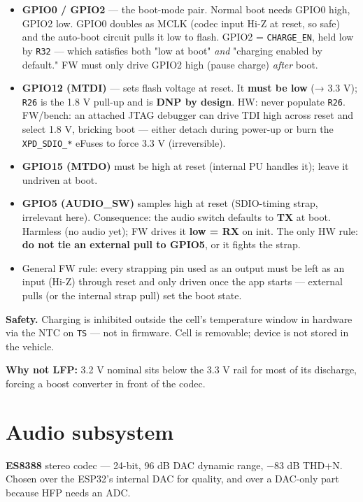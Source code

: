 \documentclass[11pt]{article}
\begin{document}
\begin{itemize}[leftmargin=1.4em]
\item \textbf{GPIO0 / GPIO2} — the boot-mode pair. Normal boot needs GPIO0 high, GPIO2 low. GPIO0
  doubles as MCLK (codec input Hi-Z at reset, so safe) and the auto-boot circuit pulls it low to
  flash. GPIO2 = \texttt{CHARGE_EN}, held low by \texttt{R32} — which satisfies both "low at boot"
  \textit{and} "charging enabled by default." FW must only drive GPIO2 high (pause charge)
  \textit{after} boot.
\item \textbf{GPIO12 (MTDI)} — sets flash voltage at reset. It \textbf{must be low} (→ 3.3 V);
  \texttt{R26} is the 1.8 V pull-up and is \textbf{DNP by design}. HW: never populate \texttt{R26}.
  FW/bench: an attached JTAG debugger can drive TDI high across reset and select 1.8 V, bricking
  boot — either detach during power-up or burn the \texttt{XPD_SDIO_*} eFuses to force 3.3 V
  (irreversible).
\item \textbf{GPIO15 (MTDO)} must be high at reset (internal PU handles it); leave it undriven at
  boot.
\item \textbf{GPIO5 (AUDIO_SW)} samples high at reset (SDIO-timing strap, irrelevant here).
  Consequence: the audio switch defaults to \textbf{TX} at boot. Harmless (no audio yet); FW drives
  it \textbf{low = RX} on init. The only HW rule: \textbf{do not tie an external pull to GPIO5}, or
  it fights the strap.
\item General FW rule: every strapping pin used as an output must be left as an input (Hi-Z) through
  reset and only driven once the app starts — external pulls (or the internal strap pull) set the
  boot state.
\end{itemize}

\textbf{Safety.} Charging is inhibited outside the cell's temperature window in hardware via the NTC
on \texttt{TS} — not in firmware. Cell is removable; device is not stored in the vehicle.

\textbf{Why not LFP:} 3.2 V nominal sits below the 3.3 V rail for most of its discharge, forcing a
boost converter in front of the codec.

\section{Audio subsystem}

\textbf{ES8388} stereo codec — 24-bit, 96 dB DAC dynamic range, −83 dB THD+N. Chosen over the ESP32's
internal DAC for quality, and over a DAC-only part because HFP needs an ADC.
\end{document}
